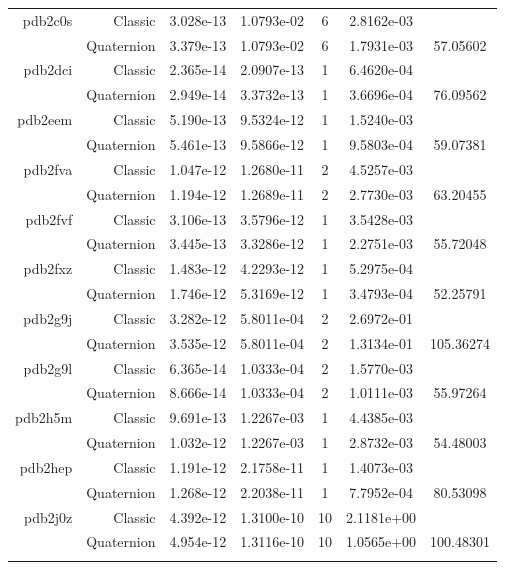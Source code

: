 \begin{xltabular}{\textwidth}{r|rS[table-format=1.3e+2]S[table-format=1.4e+2]cS[table-format=1.4e+2]S[table-format=-1.5]}
pdb2c0s & Classic & 3.028e-13 & 1.0793e-02 & 6 & 2.8162e-03 & \\
& Quaternion & 3.379e-13 & 1.0793e-02 & 6 & 1.7931e-03 & 57.05602\\  \addlinespace
pdb2dci & Classic & 2.365e-14 & 2.0907e-13 & 1 & 6.4620e-04 & \\
& Quaternion & 2.949e-14 & 3.3732e-13 & 1 & 3.6696e-04 & 76.09562\\  \addlinespace
pdb2eem & Classic & 5.190e-13 & 9.5324e-12 & 1 & 1.5240e-03 & \\
& Quaternion & 5.461e-13 & 9.5866e-12 & 1 & 9.5803e-04 & 59.07381\\  \addlinespace
pdb2fva & Classic & 1.047e-12 & 1.2680e-11 & 2 & 4.5257e-03 & \\
& Quaternion & 1.194e-12 & 1.2689e-11 & 2 & 2.7730e-03 & 63.20455\\  \addlinespace
pdb2fvf & Classic & 3.106e-13 & 3.5796e-12 & 1 & 3.5428e-03 & \\
& Quaternion & 3.445e-13 & 3.3286e-12 & 1 & 2.2751e-03 & 55.72048\\  \addlinespace
pdb2fxz & Classic & 1.483e-12 & 4.2293e-12 & 1 & 5.2975e-04 & \\
& Quaternion & 1.746e-12 & 5.3169e-12 & 1 & 3.4793e-04 & 52.25791\\  \addlinespace
pdb2g9j & Classic & 3.282e-12 & 5.8011e-04 & 2 & 2.6972e-01 & \\
& Quaternion & 3.535e-12 & 5.8011e-04 & 2 & 1.3134e-01 & 105.36274\\  \addlinespace
pdb2g9l & Classic & 6.365e-14 & 1.0333e-04 & 2 & 1.5770e-03 & \\
& Quaternion & 8.666e-14 & 1.0333e-04 & 2 & 1.0111e-03 & 55.97264\\  \addlinespace
pdb2h5m & Classic & 9.691e-13 & 1.2267e-03 & 1 & 4.4385e-03 & \\
& Quaternion & 1.032e-12 & 1.2267e-03 & 1 & 2.8732e-03 & 54.48003\\  \addlinespace
pdb2hep & Classic & 1.191e-12 & 2.1758e-11 & 1 & 1.4073e-03 & \\
& Quaternion & 1.268e-12 & 2.2038e-11 & 1 & 7.7952e-04 & 80.53098\\  \addlinespace
pdb2j0z & Classic & 4.392e-12 & 1.3100e-10 & 10 & 2.1181e+00 & \\
& Quaternion & 4.954e-12 & 1.3116e-10 & 10 & 1.0565e+00 & 100.48301\\  \addlinespace

\end{xltabular}
